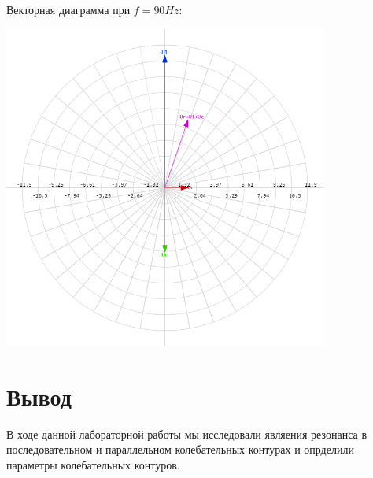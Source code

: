 \documentclass[14pt, a4paper]{article}
\begin{document}
        Векторная диаграмма при $f = 90 Hz$:

        {\includegraphics[width=0.8\textwidth]{vec90.png}}

    
    \section*{Вывод}
    В ходе данной лабораторной работы мы исследовали являения резонанса в последовательном и параллельном колебательных контурах
    и опрделили параметры колебательных контуров.
\end{document}
